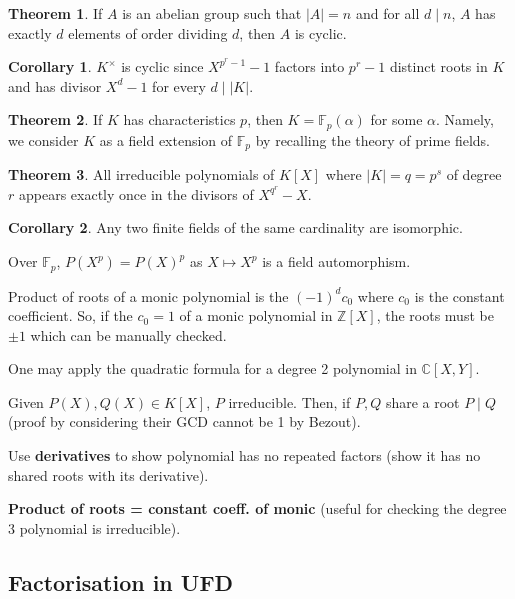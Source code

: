 \documentclass[]{article}
\theoremstyle{definition}
\newtheorem*{theorem}{Theorem}
\newtheorem*{corollary}{Corollary}
\begin{document}
\begin{theorem}
  If \(A\) is an abelian group such that \(|A| = n\) and for all \(d \mid n\), \(A\) has exactly 
  \(d\) elements of order dividing \(d\), then \(A\) is cyclic. 
\end{theorem}

\begin{corollary}
  \(K^\times\) is cyclic since \(X^{p^r - 1} - 1\) factors into \(p^r - 1\) distinct roots in 
  \(K\) and has divisor \(X^d - 1\) for every \(d \mid |K|\).
\end{corollary}

\begin{theorem}
  If \(K\) has characteristics \(p\), then \(K = \mathbb{F}_p(\alpha)\) for some \(\alpha\). 
  Namely, we consider \(K\) as a field extension of \(\mathbb{F}_p\) by recalling the theory of 
  prime fields.
\end{theorem}

\begin{theorem}
  All irreducible polynomials of \(K[X]\) where \(|K| = q = p^s\) of degree \(r\) appears exactly once 
  in the divisors of \(X^{q^r} - X\).
\end{theorem}

\begin{corollary}
  Any two finite fields of the same cardinality are isomorphic.
\end{corollary}

Over \(\mathbb{F}_p\), \(P(X^p) = P(X)^p\) as \(X \mapsto X^p\) is a field automorphism.

Product of roots of a monic polynomial is the \((-1)^d c_0\) where \(c_0\) is the constant coefficient. 
So, if the \(c_0 = 1\) of a monic polynomial in \(\mathbb{Z}[X]\), the roots must be \(\pm 1\) which 
can be manually checked.

One may apply the quadratic formula for a degree 2 polynomial in \(\mathbb{C}[X, Y]\).

Given \(P(X), Q(X) \in K[X]\), \(P\) irreducible. Then, if \(P, Q\) share a root \(P \mid Q\) 
(proof by considering their GCD cannot be 1 by Bezout).

Use \textbf{derivatives} to show polynomial has no repeated factors (show it has no shared roots with 
its derivative).

\textbf{Product of roots = constant coeff. of monic} (useful for checking the degree 3 polynomial is irreducible).

\subsection*{Factorisation in UFD}
\end{document}
